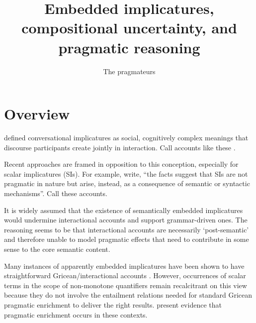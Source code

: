 \documentclass{article}
\begin{document}

\title{Embedded implicatures, compositional uncertainty, and pragmatic reasoning}
\author{The pragmateurs}
\maketitle


\section{Overview}\label{sec:introduction}

\begin{examples}
\item \citet{Grice75} defined conversational implicatures as social,
  cognitively complex meanings that discourse participants create
  jointly in interaction. Call accounts like these
  .

\item Recent approaches are framed in opposition to this conception,
  especially for scalar implicatures (SIs).  For example,
  \citet{ChierchiaFoxSpector08} write, ``the facts suggest that SIs
  are not pragmatic in nature but arise, instead, as a consequence of
  semantic or syntactic mechanisms''. Call these 
  accounts.

\item It is widely assumed that the existence of semantically embedded
  implicatures would undermine interactional accounts and support
  grammar-driven ones. The reasoning seems to be that interactional
  accounts are necessarily `post-semantic' and therefore unable to
  model pragmatic effects that need to contribute in some sense to the
  core semantic content.

\item Many instances of apparently embedded implicatures have been
  shown to have straightforward Gricean/interactional accounts
  \citep{Russell06,Geurts09,Chemla:Spector:2011}. However, occurrences
  of scalar terms in the scope of non-monotone quantifiers remain
  recalcitrant on this view because they do not involve the entailment
  relations needed for standard Gricean pragmatic enrichment to
  deliver the right results. \citet{Chemla:Spector:2011} present
  evidence that pragmatic enrichment occurs in these contexts.
  

\end{examples}
\end{document}
